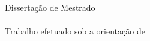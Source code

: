\begin{titlepage}
\color{PANTONECoolGray7C}
\thelogo
\leading{20.4pt}
{\Large
\theauthor
\\
%
\\
\textbf{\thetitleA}
\\
\textbf{\thetitleB}
\\
\textbf{\thetitleC}
}

\vspace*{\fill}
{\footnotesize \myear}
\end{titlepage}

\null
\thispagestyle{empty}
\pagecolor{PANTONECoolGray7C}
\afterpage{\nopagecolor}
\newpage

\begin{titlepage}
\color{PANTONECoolGray7C}
\thelogoB
\leading{20.4pt}
{\Large
\theauthor
\\
%
\\
\textbf{\thetitleA}
\\
\textbf{\thetitleB}
\\
\textbf{\thetitleC}
}

\vspace{55.2mm}
\leading{16.8pt}
{\large
Dissertação de Mestrado
\\
\themasters
\\
\thearea
Trabalho efetuado sob a orientação de
\\
\textbf{\thesupervisor}
\\
\thecosupervisor}

\vspace*{\fill}
{\footnotesize \myear}
\end{titlepage}
